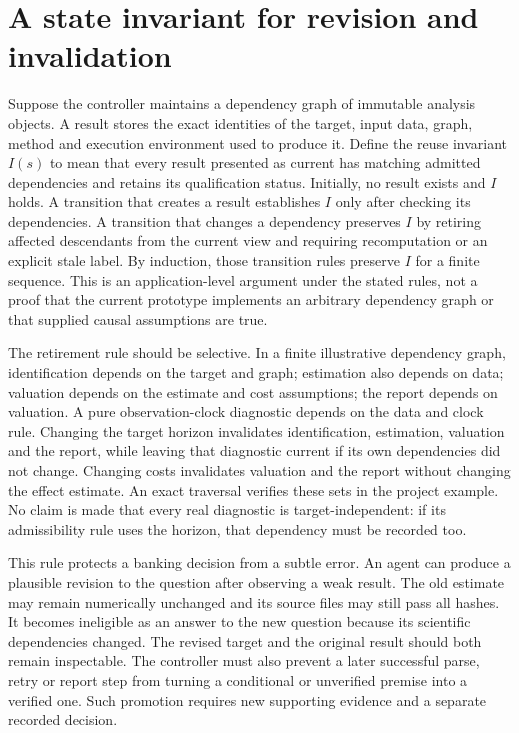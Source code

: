 \section{A state invariant for revision and invalidation}

Suppose the controller maintains a dependency graph of immutable analysis
objects. A result stores the exact identities of the target, input data,
graph, method and execution environment used to produce it. Define the
reuse invariant $I(s)$ to mean that every result presented as current has
matching admitted dependencies and retains its qualification status.
Initially, no result exists and $I$ holds. A transition that creates a
result establishes $I$ only after checking its dependencies. A transition
that changes a dependency preserves $I$ by retiring affected descendants
from the current view and requiring recomputation or an explicit stale
label. By induction, those transition rules preserve $I$ for a finite
sequence. This is an application-level argument under the stated rules,
not a proof that the current prototype implements an arbitrary dependency
graph or that supplied causal assumptions are true. \citep{exec14_l6_exact}

The retirement rule should be selective. In a finite illustrative dependency
graph, identification depends on the target and graph; estimation also
depends on data; valuation depends on the estimate and cost assumptions;
the report depends on valuation. A pure observation-clock diagnostic depends
on the data and clock rule. Changing the target horizon invalidates
identification, estimation, valuation and the report, while leaving that
diagnostic current if its own dependencies did not change. Changing costs
invalidates valuation and the report without changing the effect estimate.
An exact traversal verifies these sets in the project example. No claim is
made that every real diagnostic is target-independent: if its admissibility
rule uses the horizon, that dependency must be recorded too.
\citep{exec14_l6_exact}

This rule protects a banking decision from a subtle error. An agent can
produce a plausible revision to the question after observing a weak result.
The old estimate may remain numerically unchanged and its source files may
still pass all hashes. It becomes ineligible as an answer to the new
question because its scientific dependencies changed. The revised target
and the original result should both remain inspectable. The controller
must also prevent a later successful parse, retry or report step from
turning a conditional or unverified premise into a verified one. Such
promotion requires new supporting evidence and a separate recorded decision.

